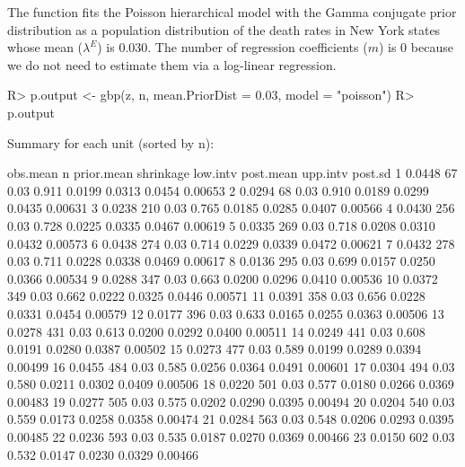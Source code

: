 \documentclass[article]{jss}
\begin{document}
The function  fits the Poisson hierarchical model with the Gamma conjugate prior distribution as a population distribution of the death rates in New York states whose mean ($\lambda^E$) is 0.030. The number of regression coefficients ($m$) is 0 because we do not need to estimate them via  a log-linear regression. 
\begin{CodeChunk}
\begin{CodeInput}
R> p.output <- gbp(z, n, mean.PriorDist = 0.03, model = "poisson")
R> p.output
\end{CodeInput}
\begin{CodeOutput}
Summary for each unit (sorted by n):

         obs.mean    n prior.mean shrinkage low.intv post.mean upp.intv post.sd
1          0.0448   67       0.03     0.911   0.0199    0.0313   0.0454 0.00653
2          0.0294   68       0.03     0.910   0.0189    0.0299   0.0435 0.00631
3          0.0238  210       0.03     0.765   0.0185    0.0285   0.0407 0.00566
4          0.0430  256       0.03     0.728   0.0225    0.0335   0.0467 0.00619
5          0.0335  269       0.03     0.718   0.0208    0.0310   0.0432 0.00573
6          0.0438  274       0.03     0.714   0.0229    0.0339   0.0472 0.00621
7          0.0432  278       0.03     0.711   0.0228    0.0338   0.0469 0.00617
8          0.0136  295       0.03     0.699   0.0157    0.0250   0.0366 0.00534
9          0.0288  347       0.03     0.663   0.0200    0.0296   0.0410 0.00536
10         0.0372  349       0.03     0.662   0.0222    0.0325   0.0446 0.00571
11         0.0391  358       0.03     0.656   0.0228    0.0331   0.0454 0.00579
12         0.0177  396       0.03     0.633   0.0165    0.0255   0.0363 0.00506
13         0.0278  431       0.03     0.613   0.0200    0.0292   0.0400 0.00511
14         0.0249  441       0.03     0.608   0.0191    0.0280   0.0387 0.00502
15         0.0273  477       0.03     0.589   0.0199    0.0289   0.0394 0.00499
16         0.0455  484       0.03     0.585   0.0256    0.0364   0.0491 0.00601
17         0.0304  494       0.03     0.580   0.0211    0.0302   0.0409 0.00506
18         0.0220  501       0.03     0.577   0.0180    0.0266   0.0369 0.00483
19         0.0277  505       0.03     0.575   0.0202    0.0290   0.0395 0.00494
20         0.0204  540       0.03     0.559   0.0173    0.0258   0.0358 0.00474
21         0.0284  563       0.03     0.548   0.0206    0.0293   0.0395 0.00485
22         0.0236  593       0.03     0.535   0.0187    0.0270   0.0369 0.00466
23         0.0150  602       0.03     0.532   0.0147    0.0230   0.0329 0.00466

\end{CodeOutput}
\end{CodeChunk}
\end{document}
